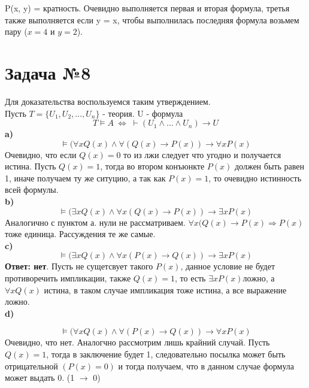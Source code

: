 \documentclass[a4paper,12pt]{article} %
\begin{document}
 P(x, y) = кратность.
Очевидно выполняется первая и вторая формула, третья также выполняется если y = x, 
чтобы выполнилась последняя формула возьмем пару ($x = 4$ и $y = 2$).
\section*{Задача №8}
Для доказательства воспользуемся таким утверждением. \\
Пусть $T = \{U_1, U_2, \ldots, U_n\}$ - теория. U - формула \\ 
\[T \models A \ \Leftrightarrow \; \vdash (U_1 \wedge ...  \wedge U_n) \rightarrow U\]
\textbf{a)}
\[
   \models (\forall x Q(x) \wedge \forall(Q(x) \rightarrow P(x)) \rightarrow \forall x P(x)
\]
Очевидно, что если $Q(x) = 0$ то из лжи следует что угодно и получается истина.
Пусть $Q(x) = 1$, тогда во втором конъюнкте $P(x)$ должен быть равен 1, иначе получаем ту же 
ситуцию, а так как $P(x) = 1$, то очевидно истинность всей формулы. \\ 
\textbf{b)}
\[
   \models (\exists x Q(x) \wedge \forall x(Q(x) \rightarrow P(x)) \rightarrow \exists x P(x)
\]
Аналогично с пунктом а. нули не рассматриваем. $\forall x(Q(x) \rightarrow P(x) \Rightarrow P(x)$ тоже единица.
Рассуждения те же самые.\\
\textbf{c)}
\[
   \models (\exists x Q(x) \wedge \forall x(P(x) \rightarrow Q(x)) \rightarrow \exists x P(x)
\]
\textbf{Ответ: нет}. Пусть не сущетсвует такого $P(x)$, данное условие не будет 
противоречить импликации, также $Q(x) = 1$, то есть $\exists xP(x) ложно$, а $\forall x Q(x)$ истина, 
в таком случае импликация тоже истина, а все выражение ложно.  
\\\textbf{d)}

\[
   \models (\forall x Q(x) \wedge \forall(P(x) \rightarrow Q(x)) \rightarrow \forall x P(x)
\]
Очевидно, что нет. Аналогчно рассмотрим лишь крайний случай. Пусть $Q(x) = 1$, тогда в 
заключение будет 1, следовательно  посылка может быть отрицательной $(P(x) = 0)$ и тогда получаем, что в данном случае
формула может выдать 0. (1 $\rightarrow$ 0)
\end{document}
